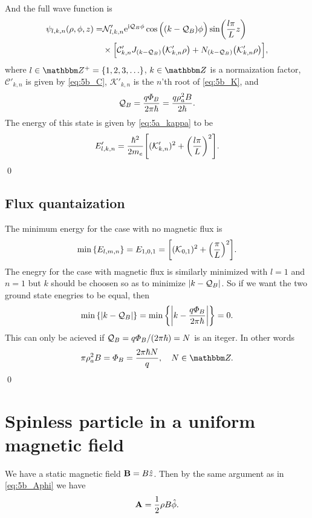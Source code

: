 \documentclass[11pt,letter, swedish, english
]{article}
\begin{document}
And the full wave function is
\begin{equation}
\begin{aligned}
\psi_{l,k,n}(\rho, \phi, z)=&
\mathcal{N}'_{l,k,n}\mathrm{e}^{\mathrm{i}\mathcal{Q}_B\phi}\cos\Big((k-\mathcal{Q}_B)\phi\Big)
\sin(\frac{l\pi}{L}z)\\
&\times
\Big[\mathcal{C}'_{k,n}J_{(k-\mathcal{Q}_B)}\qty(\mathcal{K}'_{k,n}\rho)+
N_{(k-\mathcal{Q}_B)}\qty(\mathcal{K}'_{k,n}\rho) \Big],
\end{aligned}
\end{equation}
where $l\in\Z^+=\{1, 2, 3,\ldots\}$, $k\in\Z$ is a normaization factor, 
$\mathcal{C}'_{k,n}$ is given by \eqref{eq:5b_C}, 
$\mathcal{K}'_{k,n}$ is the $n$'th root of \eqref{eq:5b_K},
and 
\begin{equation}
\mathcal{Q}_B=\frac{q\varPhi_B}{2\pi\hbar}
=\frac{q \rho_a^2 B}{2\hbar}.
\end{equation}
The energy of this state is given by \eqref{eq:5a_kappa} to be
\begin{equation}
E'_{l,k,n}=\frac{\hbar^2}{2m_e}\qty[(\mathcal{K}'_{k,n})^2 + \qty(\frac{l\pi}{L})^2].
\end{equation}
\qed


\subsection{Flux quantaization}
The minimum energy for the case with no magnetic flux is
\begin{equation}
\min\qty{E_{l,m,n}}=E_{1,0,1}
=\qty[(\mathcal{K}_{0,1})^2 + \qty(\frac{\pi}{L})^2].
\end{equation}
The enegry for the case with magnetic flux is similarly minimized with
$l=1$ and $n=1$ but $k$ should be choosen so as to minimize
$|k-\mathcal{Q}_B|$. So if we want the two ground state enegries to be equal,
then
\begin{equation}
\min\qty{\abs{k-\ensuremath{\mathcal{Q}_B}}}
=\min\qty{\abs{k-\frac{q\varPhi_B}{2\pi\hbar}}}=0.
\end{equation}
This can only be acieved if $\mathcal{Q}_B=q\varPhi_B/(2\pi\hbar)=N$ is an
iteger. In other words
\begin{equation}
\pi\rho_a^2B=\varPhi_B=\frac{2\pi\hbar N}{q}\qcomma N\in\Z.
\end{equation}
\qed





\section{Spinless particle in a uniform magnetic field}
We have a static magnetic field $\vb{B}=B\hat{z}$. Then by
the same argument as in \eqref{eq:5b_Aphi} we have
\begin{equation}\label{eq:6_A}
\vb{A}=\frac{1}{2}\rho B\hat{\phi}.
\end{equation}
\end{document}

